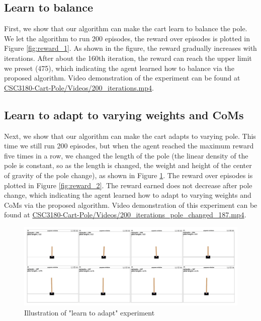 \documentclass[10pt,a4paper]{article}
\begin{document}
	\subsection{Learn to balance}
	First, we show that our algorithm can make the cart learn to balance the pole. We let the algorithm to run 200 episodes, the reward over episodes is plotted in Figure \ref{fig:reward_1}. 
	As shown in the figure, the reward gradually increases with iterations. After about the 160th iteration, the reward can reach the upper limit we preset (475), which indicating the agent learned how to balance via the proposed algorithm. Video demonstration of the experiment can be found at \href{https://1drv.ms/f/s!AmutmbT5H6Pkm0sNJx83Q54XewmB?e=HUkzYK}{CSC3180-Cart-Pole/Videos/200\_iterations.mp4}.
	
	
	
	\subsection{Learn to adapt to varying weights and CoMs}
	Next, we show that our algorithm can make the cart adapts to varying pole. This time we still run 200 episodes, but when the agent reached the maximum reward five times in a row, we changed the length of the pole (the linear density of the pole is constant, so as the length is changed, the weight and height of the center of gravity of the pole change), as shown in Figure \ref{fig:changepole}. The reward over episodes is plotted in Figure \ref{fig:reward_2}. The reward earned does not decrease after pole change, which indicating the agent learned how to adapt to varying weights and CoMs via the proposed algorithm. Video demonstration of this experiment can be found at \href{https://1drv.ms/f/s!AmutmbT5H6Pkm0sNJx83Q54XewmB?e=HUkzYK}{CSC3180-Cart-Pole/Videos/200\_iterations\_pole\_changed\_187.mp4}.
	
	\begin{figure}
		\centering
		\includegraphics[width=1\linewidth]{figure/change_pole}
		\caption{Illustration of "learn to adapt" experiment}
		\label{fig:changepole}
	\end{figure}
	
\end{document}
